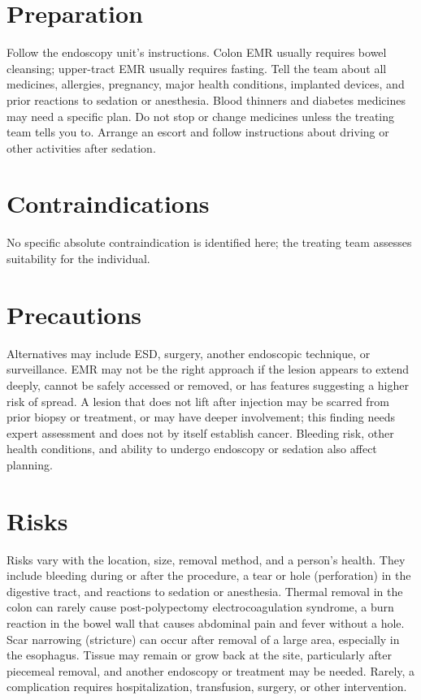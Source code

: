 \section*{Preparation}
Follow the endoscopy unit's instructions. Colon EMR usually requires bowel cleansing; upper-tract EMR usually requires fasting. Tell the team about all medicines, allergies, pregnancy, major health conditions, implanted devices, and prior reactions to sedation or anesthesia. Blood thinners and diabetes medicines may need a specific plan. Do not stop or change medicines unless the treating team tells you to. Arrange an escort and follow instructions about driving or other activities after sedation.

\section*{Contraindications}
No specific absolute contraindication is identified here; the treating team assesses suitability for the individual.

\section*{Precautions}
Alternatives may include ESD, surgery, another endoscopic technique, or surveillance. EMR may not be the right approach if the lesion appears to extend deeply, cannot be safely accessed or removed, or has features suggesting a higher risk of spread. A lesion that does not lift after injection may be scarred from prior biopsy or treatment, or may have deeper involvement; this finding needs expert assessment and does not by itself establish cancer. Bleeding risk, other health conditions, and ability to undergo endoscopy or sedation also affect planning.

\section*{Risks}
Risks vary with the location, size, removal method, and a person's health. They include bleeding during or after the procedure, a tear or hole (perforation) in the digestive tract, and reactions to sedation or anesthesia. Thermal removal in the colon can rarely cause post-polypectomy electrocoagulation syndrome, a burn reaction in the bowel wall that causes abdominal pain and fever without a hole. Scar narrowing (stricture) can occur after removal of a large area, especially in the esophagus. Tissue may remain or grow back at the site, particularly after piecemeal removal, and another endoscopy or treatment may be needed. Rarely, a complication requires hospitalization, transfusion, surgery, or other intervention.

